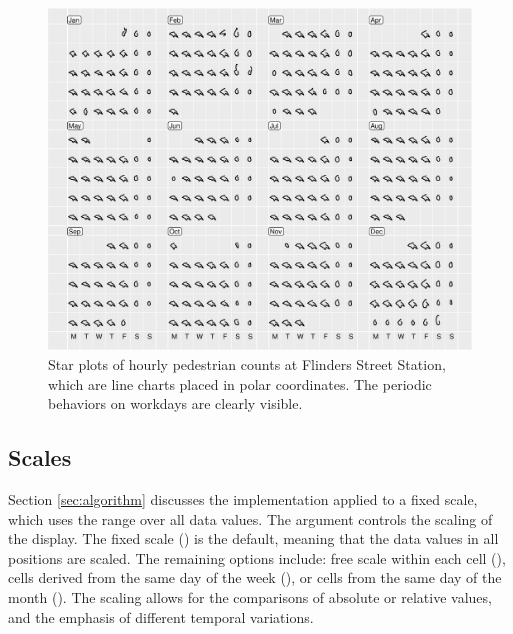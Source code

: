 \documentclass[article]{jss}
\theoremstyle{definition}
\theoremstyle{definition}
\theoremstyle{remark}
\begin{document}
\begin{CodeChunk}
\begin{figure}

{\centering \includegraphics[width=\textwidth]{figure/flinders-polar-1} 

}

\caption[Star plots of hourly pedestrian counts at
Flinders Street Station, which are line charts placed in polar
coordinates. The periodic behaviors on workdays are clearly visible.]{Star plots of hourly pedestrian counts at
Flinders Street Station, which are line charts placed in polar
coordinates. The periodic behaviors on workdays are clearly visible.}\label{fig:flinders-polar}
\end{figure}
\end{CodeChunk}





\subsection{Scales}\label{scales}

Section \ref{sec:algorithm} discusses the implementation applied to a
fixed scale, which uses the range over all data values. The 
argument controls the scaling of the display. The fixed scale
() is the default, meaning that the data values in all
positions are scaled. The remaining options include: free scale within
each cell (), cells derived from the same day of the week
(), or cells from the same day of the month
(). The scaling allows for the comparisons of absolute
or relative values, and the emphasis of different temporal variations.
\end{document}
